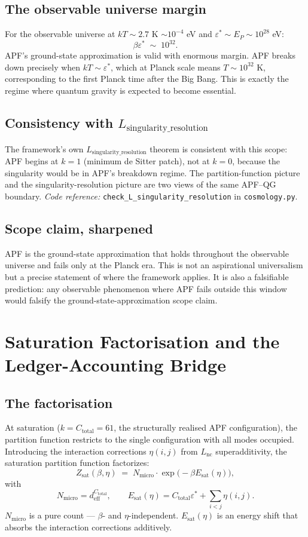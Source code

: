 \documentclass[11pt]{article}
\newcommand{\coderef}[2]{\smallskip\noindent\textit{Code reference:} \texttt{#1} in \texttt{#2}.}
\theoremstyle{definition}
\begin{document}
\subsection{The observable universe margin}
For the observable universe at $kT \sim 2.7$ K $\sim 10^{-4}$ eV and $\varepsilon^* \sim E_P \sim 10^{28}$ eV:
\[
\beta \varepsilon^* \;\sim\; 10^{32}.
\]
APF's ground-state approximation is valid with enormous margin.  APF breaks down precisely when $kT \sim \varepsilon^*$, which at Planck scale means $T \sim 10^{32}$ K, corresponding to the first Planck time after the Big Bang.  This is exactly the regime where quantum gravity is expected to become essential.

\subsection{Consistency with $L_{\mathrm{singularity\_resolution}}$}
The framework's own $L_{\mathrm{singularity\_resolution}}$ theorem is consistent with this scope: APF begins at $k = 1$ (minimum de Sitter patch), not at $k = 0$, because the singularity would be in APF's breakdown regime.  The partition-function picture and the singularity-resolution picture are two views of the same APF--QG boundary.
\coderef{check\_L\_singularity\_resolution}{cosmology.py}

\subsection{Scope claim, sharpened}
APF is the ground-state approximation that holds throughout the observable universe and fails only at the Planck era.  This is not an aspirational universalism but a precise statement of where the framework applies.  It is also a falsifiable prediction: any observable phenomenon where APF fails outside this window would falsify the ground-state-approximation scope claim.

\section{Saturation Factorisation and the Ledger-Accounting Bridge}\label{sec:satfact}

\subsection{The factorisation}
At saturation ($k = C_{\mathrm{total}} = 61$, the structurally realised APF configuration), the partition function restricts to the single configuration with all modes occupied.  Introducing the interaction corrections $\eta(i,j)$ from $L_{\mathrm{nc}}$ superadditivity, the saturation partition function factorizes:
\[
Z_{\mathrm{sat}}(\beta, \eta) \;=\; N_{\mathrm{micro}} \cdot \exp\!\bigl(-\beta E_{\mathrm{sat}}(\eta)\bigr),
\]
with
\[
N_{\mathrm{micro}} = d_{\mathrm{eff}}^{C_{\mathrm{total}}}, \qquad E_{\mathrm{sat}}(\eta) = C_{\mathrm{total}} \varepsilon^* + \sum_{i < j} \eta(i,j).
\]
$N_{\mathrm{micro}}$ is a pure count --- $\beta$- and $\eta$-independent.  $E_{\mathrm{sat}}(\eta)$ is an energy shift that absorbs the interaction corrections additively.
\end{document}
